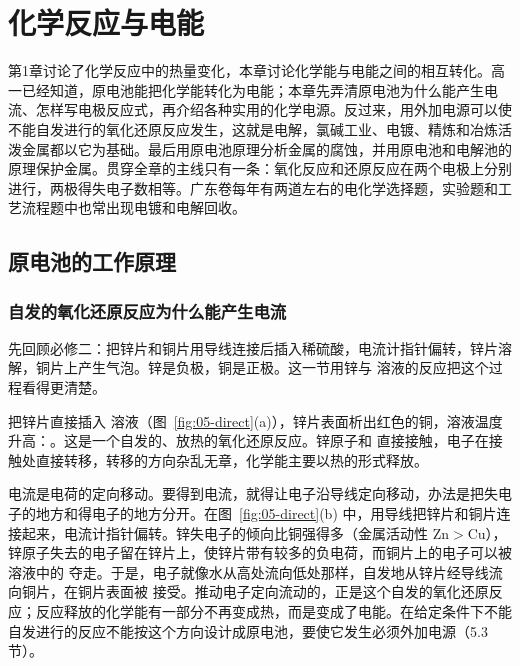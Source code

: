 \documentclass[UTF8,a4paper,zihao=5,oneside,openany,fontset=none]{ctexbook}
\begin{document}
\chapter{化学反应与电能}

第1章讨论了化学反应中的热量变化，本章讨论化学能与电能之间的相互转化。高一已经知道，原电池能把化学能转化为电能；本章先弄清原电池为什么能产生电流、怎样写电极反应式，再介绍各种实用的化学电源。反过来，用外加电源可以使不能自发进行的氧化还原反应发生，这就是电解，氯碱工业、电镀、精炼和冶炼活泼金属都以它为基础。最后用原电池原理分析金属的腐蚀，并用原电池和电解池的原理保护金属。贯穿全章的主线只有一条：氧化反应和还原反应在两个电极上分别进行，两极得失电子数相等。广东卷每年有两道左右的电化学选择题，实验题和工艺流程题中也常出现电镀和电解回收。

\section{原电池的工作原理}

\subsection{自发的氧化还原反应为什么能产生电流}
先回顾必修二：把锌片和铜片用导线连接后插入稀硫酸，电流计指针偏转，锌片溶解，铜片上产生气泡。锌是负极，铜是正极。这一节用锌与  溶液的反应把这个过程看得更清楚。

把锌片直接插入  溶液（图~\ref{fig:05-direct}(a)），锌片表面析出红色的铜，溶液温度升高：。这是一个自发的、放热的氧化还原反应。锌原子和  直接接触，电子在接触处直接转移，转移的方向杂乱无章，化学能主要以热的形式释放。

电流是电荷的定向移动。要得到电流，就得让电子沿导线定向移动，办法是把失电子的地方和得电子的地方分开。在图~\ref{fig:05-direct}(b) 中，用导线把锌片和铜片连接起来，电流计指针偏转。锌失电子的倾向比铜强得多（金属活动性 Zn$>$Cu），锌原子失去的电子留在锌片上，使锌片带有较多的负电荷，而铜片上的电子可以被溶液中的  夺走。于是，电子就像水从高处流向低处那样，自发地从锌片经导线流向铜片，在铜片表面被  接受。推动电子定向流动的，正是这个自发的氧化还原反应；反应释放的化学能有一部分不再变成热，而是变成了电能。在给定条件下不能自发进行的反应不能按这个方向设计成原电池，要使它发生必须外加电源（5.3 节）。
\end{document}
